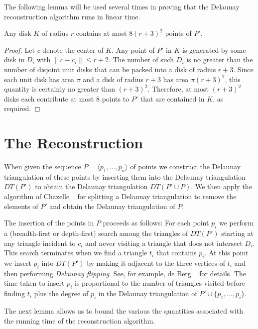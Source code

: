 \documentclass[lotsofwhite]{patmorin}
\begin{document}
The following lemma will be used several times in proving that the
Delaunay reconstruction algorithm runs in linear time.

\begin{lem}
Any disk $K$ of radius $r$ contains at most $8(r+3)^2$ points of $P'$.
\end{lem}

\begin{proof}
Let $c$ denote the center of $K$.  Any point of $P'$ in $K$ is
generated by some disk in $D_i$ with $\|c -
c_i\| \le r+2$.  The number of such $D_i$ is no greater than the
number of disjoint unit disks that can be packed into a disk of radius
$r+3$.  Since each unit disk has area $\pi$ and a disk of radius $r+3$
has area $\pi (r+3)^2$, this quantity is certainly no greater than
$(r+3)^2$.  Therefore, at most $(r+3)^2$ disks each contribute at most
$8$ points to $P'$ that are contained in $K$, as required.
\end{proof}


\section{The Reconstruction}

When given the sequence $P=\langle p_1,\ldots,p_n\rangle$ of points we
construct the Delaunay triangulation of these points by inserting them
into the Delaunay triangulation $DT(P')$ to obtain the Delaunay
triangulation $DT(P'\cup P)$. We then apply the algorithm of Chazelle
\etal\ \cite{cdhmst02} for splitting a Delaunay triangulation to remove the
elements of $P'$ and obtain the Delaunay triangulation of $P$.

The insertion of the points in $P$ proceeds as follows: For each point
$p_i$ we perform a (breadth-first or depth-first) search among the
triangles of $DT(P')$ starting at any triangle incident to $c_i$ and
never visiting a triangle that does not intersect $D_i$.  This search
terminates when we find a triangle $t_i$ that contains $p_i$.  At
this point we insert $p_i$ into $DT(P')$ by making it adjacent to the
three vertices of $t_i$ and then performing \emph{Delaunay flipping}.
See, for example, de Berg \etal\ \cite[Section~9.3]{bcko08} for
details.  The time taken to insert $p_i$ is proportional to the number
of triangles visited before finding $t_i$ plus the degree of $p_i$ in
the Delaunay triangulation of $P'\cup\{p_1,\ldots,p_i\}$.

The next lemma allows us to bound the various the quantities
associated with the running time of the reconstruction algorithm.
\end{document}
